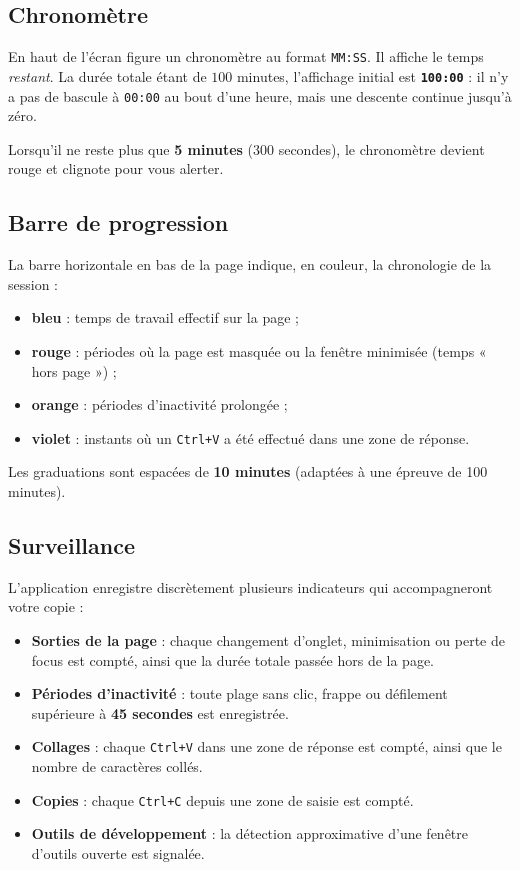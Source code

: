 \documentclass[11pt,a4paper]{article}
\begin{document}
\subsection{Chronomètre}

En haut de l'écran figure un chronomètre au format \texttt{MM:SS}. Il affiche le
temps \emph{restant}. La durée totale étant de \(100\) minutes, l'affichage
initial est \textbf{\texttt{100:00}} : il n'y a pas de bascule à \texttt{00:00}
au bout d'une heure, mais une descente continue jusqu'à zéro.

Lorsqu'il ne reste plus que \textbf{5 minutes} (300 secondes), le chronomètre
devient rouge et clignote pour vous alerter.

\subsection{Barre de progression}

La barre horizontale en bas de la page indique, en couleur, la chronologie de
la session :
\begin{itemize}
  \item \textbf{bleu} : temps de travail effectif sur la page ;
  \item \textbf{rouge} : périodes où la page est masquée ou la fenêtre
        minimisée (temps « hors page ») ;
  \item \textbf{orange} : périodes d'inactivité prolongée ;
  \item \textbf{violet} : instants où un \texttt{Ctrl+V} a été effectué dans
        une zone de réponse.
\end{itemize}
Les graduations sont espacées de \textbf{10 minutes} (adaptées à une épreuve
de 100 minutes).

\subsection{Surveillance}

L'application enregistre discrètement plusieurs indicateurs qui accompagneront
votre copie :
\begin{itemize}
  \item \textbf{Sorties de la page} : chaque changement d'onglet, minimisation
        ou perte de focus est compté, ainsi que la durée totale passée hors
        de la page.
  \item \textbf{Périodes d'inactivité} : toute plage sans clic, frappe ou
        défilement supérieure à \textbf{45 secondes} est enregistrée.
  \item \textbf{Collages} : chaque \texttt{Ctrl+V} dans une zone de réponse
        est compté, ainsi que le nombre de caractères collés.
  \item \textbf{Copies} : chaque \texttt{Ctrl+C} depuis une zone de saisie
        est compté.
  \item \textbf{Outils de développement} : la détection approximative d'une
        fenêtre d'outils ouverte est signalée.
\end{itemize}
\end{document}
